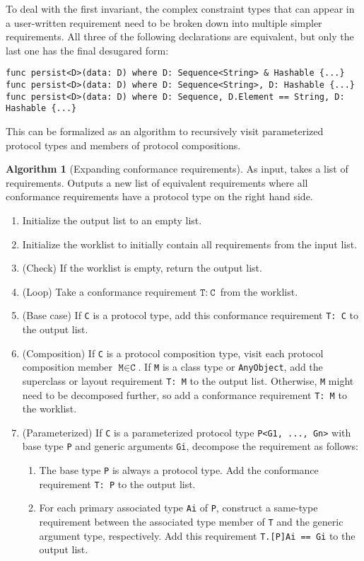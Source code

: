 \documentclass[a4paper,headsepline,bibliography=totoc,toc=flat,fleqn,twoside=semi]{scrbook}
\theoremstyle{definition}
\theoremstyle{definition}
\theoremstyle{definition}
\newtheorem{algorithm}{Algorithm}[chapter]
\begin{document}
To deal with the first invariant, the complex constraint types that can appear in a user-written requirement need to be broken down into multiple simpler requirements. All three of the following declarations are equivalent, but only the last one has the final desugared form:
\begin{Verbatim}
func persist<D>(data: D) where D: Sequence<String> & Hashable {...}
func persist<D>(data: D) where D: Sequence<String>, D: Hashable {...}
func persist<D>(data: D) where D: Sequence, D.Element == String, D: Hashable {...}
\end{Verbatim}
This can be formalized as an algorithm to recursively visit parameterized protocol types and members of protocol compositions.
\begin{algorithm}[Expanding conformance requirements] As input, takes a list of requirements. Outputs a new list of equivalent requirements where all conformance requirements have a protocol type on the right hand side.
\begin{enumerate}
\item Initialize the output list to an empty list.
\item Initialize the worklist to initially contain all requirements from the input list.
\item (Check) If the worklist is empty, return the output list.
\item (Loop) Take a conformance requirement $\texttt{T}:~\texttt{C}$ from the worklist.
\item (Base case) If \texttt{C} is a protocol type, add this conformance requirement \texttt{T:~C} to the output list.
\item (Composition) If \texttt{C} is a protocol composition type, visit each protocol composition member $\texttt{M}\in\texttt{C}$. If \texttt{M} is a class type or \texttt{AnyObject}, add the superclass or layout requirement \texttt{T:~M} to the output list. Otherwise, \texttt{M} might need to be decomposed further, so add a conformance requirement \texttt{T:~M} to the worklist.
\item (Parameterized) If \texttt{C} is a parameterized protocol type \texttt{P<G1, ..., Gn>} with base type \texttt{P} and generic arguments \texttt{Gi}, decompose the requirement as follows:
\begin{enumerate}
\item The base type \texttt{P} is always a protocol type. Add the conformance requirement \texttt{T:~P} to the output list.
\item For each primary associated type \texttt{Ai} of \texttt{P}, construct a same-type requirement between the associated type member of \texttt{T} and the generic argument type, respectively. Add this requirement \texttt{T.[P]Ai == Gi} to the output list.
\end{enumerate}
\end{enumerate}
\end{algorithm}
\end{document}
